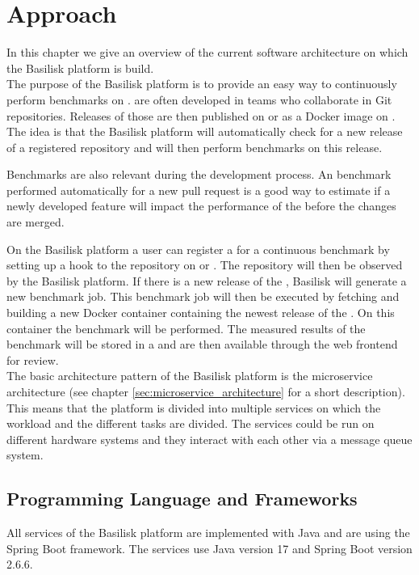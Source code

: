 \chapter{Approach}
\label{ch:approach}

In this chapter we give an overview of the current software architecture on which the Basilisk platform is build.
\\

The purpose of the Basilisk platform is to provide an easy way to continuously perform benchmarks on \tsp{}.
\tsp{} are often developed in teams who collaborate in Git repositories.
Releases of those \tsp{} are then published on \gh{} or as a Docker image on \dockh{}.
The idea is that the Basilisk platform will automatically check for a new release of a registered \ts{} repository and will then perform benchmarks on this release.

Benchmarks are also relevant during the development process.
An benchmark performed automatically for \eg{} a new pull request is a good way to estimate if a newly developed feature will impact the performance of the \ts{} before the changes are merged.

On the Basilisk platform a user can register a \ts{} for a continuous benchmark by setting up a hook to the repository on \gh{} or \dockh{}.
The repository will then be observed by the Basilisk platform.
If there is a new release of the \ts{}, Basilisk will generate a new benchmark job.
This benchmark job will then be executed by fetching and building a new Docker container containing the newest release of the \ts{}.
On this container the benchmark will be performed.
The measured results of the benchmark will be stored in a \ts{} and are then available through the web frontend for review.
\\

The basic architecture pattern of the Basilisk platform is the microservice architecture (see chapter \ref{sec:microservice_architecture} for a short description). 
This means that the platform is divided into multiple services on which the workload and the different tasks are divided.
The services could be run on different hardware systems and they interact with each other via a message queue system.
\\

\section{Programming Language and Frameworks}
\label{sec:prog_lang_and_framework}
All services of the Basilisk platform are implemented with Java and are using the Spring Boot framework.
The services use Java version 17 and Spring Boot version 2.6.6.

